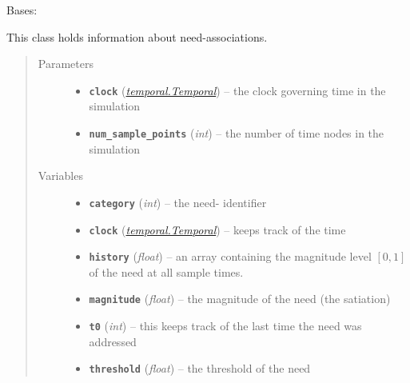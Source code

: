 \documentclass[letterpaper,10pt,english]{sphinxmanual}
\begin{document}
\begin{fulllineitems}
\label{need:need.Need}
Bases: 

This class holds information about need-associations.
\begin{quote}\begin{description}
\item[{Parameters}] \leavevmode\begin{itemize}
\item {} 
\textbf{\texttt{clock}} ({\hyperref[temporal:temporal.Temporal]{\emph{\emph{temporal.Temporal}}}}) -- the clock governing time in the simulation

\item {} 
\textbf{\texttt{num\_sample\_points}} (\emph{int}) -- the number of time nodes in the simulation

\end{itemize}

\item[{Variables}] \leavevmode\begin{itemize}
\item {} 
\textbf{\texttt{category}} (\emph{int}) -- the need- identifier

\item {} 
\textbf{\texttt{clock}} ({\hyperref[temporal:temporal.Temporal]{\emph{\emph{temporal.Temporal}}}}) -- keeps track of the time

\item {} 
\textbf{\texttt{history}} (\emph{float}) -- an array containing the magnitude level \([0,1]\) of the need at all                         sample times.

\item {} 
\textbf{\texttt{magnitude}} (\emph{float}) -- the magnitude of the need (the satiation)

\item {} 
\textbf{\texttt{t0}} (\emph{int}) -- this keeps track of the last time the need was addressed

\item {} 
\textbf{\texttt{threshold}} (\emph{float}) -- the threshold of the need

\end{itemize}

\end{description}\end{quote}


\end{fulllineitems}
\end{document}
